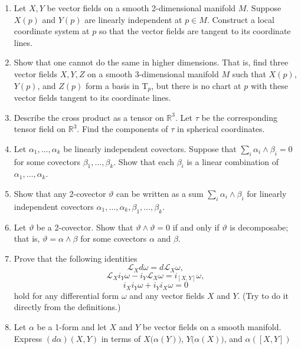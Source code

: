 \begin{enumerate}
Furthermore, the map \((X(p),Y(p))\mapsto X(Y(f))(p)\) is a symmetric bilinear form on \(\mathrm{T}_pM\).

\item Let \(X,Y\) be vector fields on a smooth 2-dimensional manifold \(M\).
Suppose \(X(p)\) and \(Y(p)\) are linearly independent at \(p\in M\).
Construct a local coordinate system at \(p\) so that the vector fields are tangent to its coordinate lines.

\item Show that one cannot do the same in higher dimensions.
That is, find three vector fields \(X,Y,Z\) on a smooth 3-dimensional manifold \(M\) such that \(X(p)\), \(Y(p)\), and \(Z(p)\) form a basis in \(\mathrm{T}_p\), but there is no chart at \(p\) with these vector fields tangent to its coordinate lines.

\item Describe the cross product as a tensor on \(\mathbb{R}^3\).
Let \(\tau\) be the corresponding tensor field on \(\mathbb{R}^3\).
Find the components of \(\tau\) in spherical coordinates.

\item Let \(\alpha_1,\dots, \alpha_k\) be linearly independent covectors.
Suppose that \(\sum_i\alpha_i\wedge\beta_i=0\)
for some covectors \(\beta_1,\dots, \beta_k\).
Show that each \(\beta_i\) is a linear combination of \(\alpha_1,\dots, \alpha_k\).

\item Show that any 2-covector \(\vartheta\) can be written as a sum \(\sum_i\alpha_i\wedge\beta_i\) for linearly independent covectors \(\alpha_1,\dots, \alpha_k,\beta_1,\dots, \beta_k\).

\item Let \(\vartheta\) be a 2-covector. Show that \(\vartheta\wedge\vartheta=0\) if and only if \(\vartheta\) is decomposabe; that is, \(\vartheta=\alpha\wedge \beta\) for some covectors \(\alpha\) and \(\beta\).

\item  Prove that the following identities
\[\mathcal{L}_Xd\omega = d\mathcal{L}_X \omega,\]
\[\mathcal{L}_X i_Y\omega- i_Y\mathcal{L}_X\omega  = i_{[X,Y]}\omega,\]
\[i_X i_Y\omega+ i_Yi_X\omega  = 0\]
hold for any differential form \(\omega\) and any vector fields \(X\) and \(Y\).
(Try to do it directly from the definitions.)

\item Let \(\alpha\) be a 1-form and let \(X\) and \(Y\) be vector fields on a smooth manifold.
Express \((d\alpha)(X,Y)\) in terms of \(X\bigl(\alpha(Y)\bigr)\), \(Y\bigl(\alpha(X)\bigr)\), and \(\alpha([X,Y])\)


\end{enumerate}
